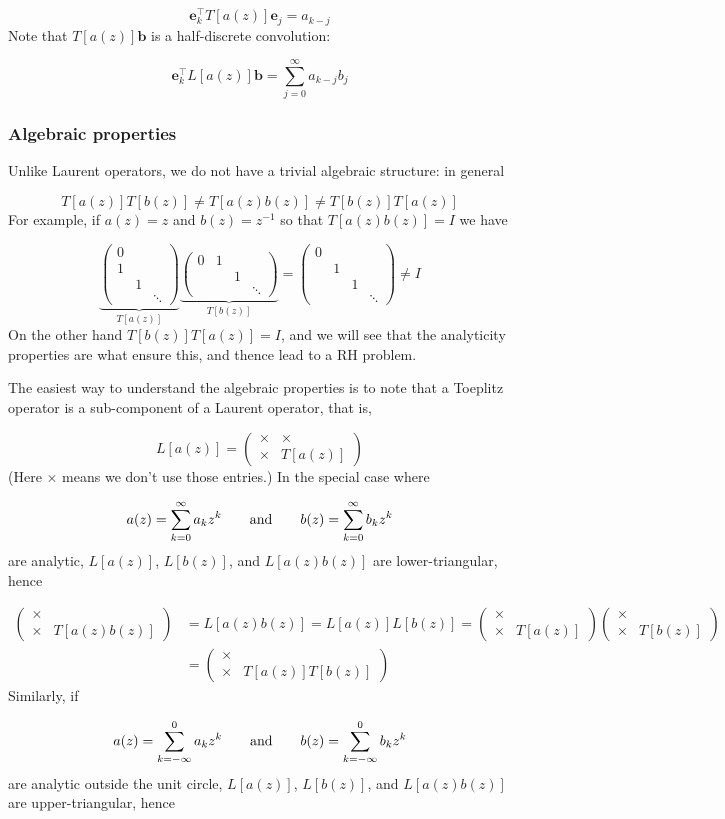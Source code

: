 \documentclass[12pt,landscape]{article}
\def\qqand{\qquad\hbox{and}\qquad}
\def\vc#1{ {\mathbf #1} }
\def\addtab#1={#1\;&=}
\def\ccr{\\\addtab}
\def\sopmatrix#1{ \begin{pmatrix}#1\end{pmatrix} }
\def\addtab#1={#1\;&=}
\def\ccr{\\\addtab}
\begin{document}
{\[
\vc e_k^\top T[a(z)] \vc e_j = a_{k-j}
\]
Note that $T[a(z)] \vc b$ is a half-discrete convolution:

\[
\vc e_k^\top L[a(z)] \vc b = \sum_{j=0}^\infty a_{k-j} b_j
\]
\subsubsection{Algebraic properties}
Unlike Laurent operators, we do not have a trivial algebraic structure: in general

\[
T[a(z)] T[b(z)] \neq T[a(z) b(z)] \neq T[b(z)] T[a(z)]
\]
For example, if $a(z) = z$ and $b(z) = z^{-1}$ so that $T[a(z)b(z)] = I$ we have

\[
\underbrace{\sopmatrix{0 \\ 1 \\ & 1 \\ &&\ddots}}_{T[a(z)]} \underbrace{\sopmatrix{0 & 1 \\ & & 1 \\ &&&\ddots}}_{T[b(z)]} = \sopmatrix{0 \\ & 1 \\ && 1 \\ &&& \ddots} \neq I
\]
On the other hand $T[b(z)] T[a(z)] = I$, and we will see that the analyticity properties are what ensure this, and thence lead to a RH problem.

The easiest way to understand the algebraic properties is to note that a Toeplitz operator is a sub-component of a Laurent operator, that is,

\[
L[a(z)] = \sopmatrix{
\times & \times \\ \times & T[a(z)]
}
\]
(Here $\times$ means we don't use those entries.) In the special case where

\[
a(z) = \sum_{k=0}^\infty a_k z^k \qqand b(z) = \sum_{k=0}^\infty b_k z^k
\]
are analytic, $L[a(z)]$, $L[b(z)]$, and $L[a(z) b(z)]$ are lower-triangular, hence


\begin{align*}
\sopmatrix{
\times &  \\ \times & T[a(z) b(z)]
} &= L[a(z)b(z)] = L[a(z)] L[b(z)] =  \sopmatrix{
\times &  \\ \times & T[a(z)]
} \sopmatrix{
\times &  \\ \times & T[b(z)]
} \ccr
= \sopmatrix{
\times &  \\ \times & T[a(z)] T[b(z)]
}
\end{align*}
Similarly, if

\[
a(z) = \sum_{k=-\infty}^0 a_k z^k \qqand b(z) = \sum_{k=-\infty}^0 b_k z^k
\]
are analytic outside the unit circle, $L[a(z)]$, $L[b(z)]$, and $L[a(z) b(z)]$ are upper-triangular, hence


}
\end{document}
